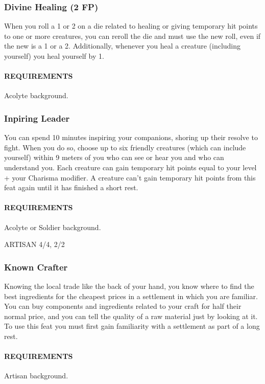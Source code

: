     \subsubsection{Divine Healing (2 FP)} \label{feat::divinehealing}
        When you roll a 1 or 2 on a die related to healing or giving temporary hit points to one or more creatures, you can reroll the die and must use the new roll, even if the new is a 1 or a 2.
        Additionally, whenever you heal a creature (including yourself) you heal yourself by 1.
        \paragraph{REQUIREMENTS} Acolyte background.

    \subsubsection{Inpiring Leader} \label{feat::inspiringleader}
        You can spend 10 minutes inspiring your companions, shoring up their resolve to fight.
        When you do so, choose up to six friendly creatures (which can include yourself) within 9 meters of you who can see or hear you and who can understand you.
        Each creature can gain temporary hit points equal to your level + your Charisma modifier.
        A creature can't gain temporary hit points from this feat again until it has finished a short rest.
        \paragraph{REQUIREMENTS} Acolyte or Soldier background.

ARTISAN 4/4, 2/2
    \subsubsection{Known Crafter} \label{feat::knowncrafter}
        Knowing the local trade like the back of your hand, you know where to find the best ingredients for the cheapest prices in a settlement in which you are familiar.
        You can buy components and ingredients related to your craft for half their normal price, and you can tell the quality of a raw material just by looking at it.
        To use this feat you must first gain familiarity with a settlement as part of a long rest.
        \paragraph{REQUIREMENTS} Artisan background.


